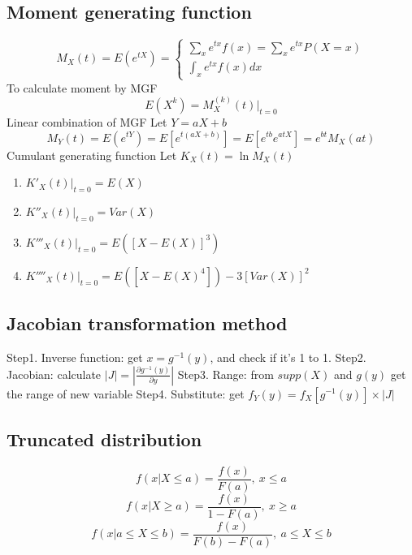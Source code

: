 \documentclass[12pt]{article}
\begin{document}
        \subsection*{Moment generating function}
        \begin{equation}
            M_X(t)=E(e^{tX})=
            \begin{cases}
                \sum_{x}e^{tx}f(x)=\sum_xe^{tx}P(X=x)\\
                \int_xe^{tx}f(x)dx
            \end{cases}
        \end{equation}
        To calculate moment by MGF
        \begin{equation}
            E(X^k)=M_X^{(k)}(t)|_{t=0}
        \end{equation}
        Linear combination of MGF
        \newline
        Let $Y=aX+b$
        \begin{equation}
            M_Y(t)=E(e^{tY})=E[e^{t(aX+b)}]=E[e^{tb}e^{atX}]=e^{bt}M_X(at)
        \end{equation}
        Cumulant generating function
        \newline
        Let $K_X(t)=\ln M_X(t)$
        \begin{enumerate}
            \item $K'_X(t)|_{t=0}=E(X)$
            \item $K''_X(t)|_{t=0}=Var(X)$
            \item $K'''_X(t)|_{t=0}=E([X-E(X)]^3)$
            \item $K''''_X(t)|_{t=0}=E([X-E(X)^4])-3[Var(X)]^2$
        \end{enumerate}
        \subsection*{Jacobian transformation method}
        Step1. Inverse function: get $x=g^{-1}(y)$, and check if it's 1 to 1.
        \newline
        Step2. Jacobian: calculate $|J|=|\frac{\partial g^{-1}(y)}{\partial y}|$
        \newline
        Step3. Range: from $supp(X)$ and $g(y)$ get the range of new variable
        \newline
        Step4. Substitute: get $f_Y(y)=f_X[g^{-1}(y)]\times |J|$
        \subsection*{Truncated distribution}
        \begin{equation}
            f(x|X\leq a)=\frac{f(x)}{F(a)},\ x\leq a
        \end{equation}
        \begin{equation}
            f(x|X\geq a)=\frac{f(x)}{1-F(a)},\ x\geq a
        \end{equation}
        \begin{equation}
            f(x|a \leq X \leq b)=\frac{f(x)}{F(b)-F(a)},\ a \leq X \leq b
        \end{equation}
\end{document}
